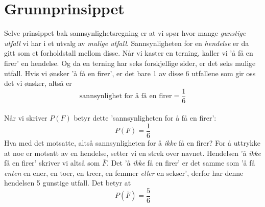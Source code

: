 




\section{Grunnprinsippet}
Selve prinsippet bak sannsynlighetsregning er at vi spør hvor mange \textit{gunstige utfall}  vi har i et utvalg av \textit{mulige utfall}. Sannsynligheten for en \textit{hendelse} er da gitt som et forholdstall mellom disse. \regv
{} \vsk
Når vi kaster en terning, kaller vi 'å få en firer' en hendelse. Og da en terning har seks forskjellige sider, er det seks mulige utfall.
Hvis vi ønsker 'å få en firer', er det bare 1 av disse 6 utfallene som gir oss det vi ønsker, altså er
\[ \text{sannsynlighet for å få en firer}=
 \frac{1}{6} \]
\qquad {} \\[5pt]
Når vi skriver $P(F)$ betyr dette 'sannsynligheten for å få en firer':
\[ P(F)=\frac{1}{6} \]
Hva med det motsatte, altså sannsynligheten for å \textsl{ikke} få en firer? For å uttrykke at noe er motsatt av en hendelse, setter vi en strek over navnet. Hendelsen 'å \textsl{ikke} få en firer' skriver vi altså som $ \bar{F} $. Det 'å \textsl{ikke} få en firer' er det samme som 'å få \textsl{enten} en ener, en toer, en treer, en femmer \textsl{eller} en sekser', derfor har denne hendelsen 5 gunstige utfall. Det betyr at
\[ P(\bar{F})=\frac{5}{6} \]

